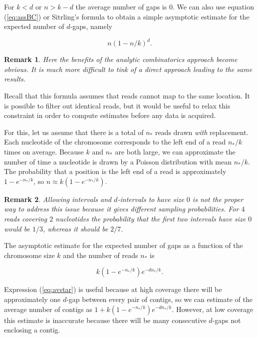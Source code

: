 \documentclass{article}
\newtheorem*{remark}{Remark}
\begin{document}
For $k < d$ or $n > k-d$ the average number of gaps is $0$.  We can also
use equation (\ref{eq:assBC}) or Sitrling's formula to obtain a simple
asymptotic estimate for the expected number of $d$-gaps, namely

\begin{equation*}
n\left(1-n/k\right)^d.
\end{equation*}

\begin{remark}
Here the benefits of the analytic combinatorics approach become obvious.
It is much more difficult to tink of a direct approach leading to the same
results.
\end{remark}

Recall that this formula assumes that reads cannot map to the same
location. It is possible to filter out identical reads, but it would be
useful to relax this constraint in order to compute estimates before any
data is acquired.

For this, let us assume that there is a total of $n_*$ reads drawn
\emph{with} replacement. Each nucleotide of the chromosome corresponds to
the left end of a read $n_*/k$ times on average. Because $k$ and $n_*$ are
both large, we can approximate the number of time a nucleotide is drawn by
a Poisson distribution with mean $n_*/k$. The probability that a position
is the left end of a read is approximately $1-e^{-n_*/k}$, so $n \approx
k(1-e^{-n_*/k})$.

\begin{remark}
Allowing intervals and $d$-intervals to have size $0$ is not the proper
way to address this issue because it gives different sampling
probabilities.  For $4$ reads covering $2$ nucleotides the probability
that the first two intervals have size $0$ would be $1/3$, whereas it
should be $2/7$.
\end{remark}

The asymptotic estimate for the expected number of gaps as a function of
the chromosome size $k$ and the number of reads $n_*$ is

\begin{equation}
\label{eq:avstar}
k(1-e^{-n_*/k})e^{-dn_*/k}.
\end{equation}

Expression (\ref{eq:avstar}) is useful because at high coverage there will
be approximately one $d$-gap between every pair of contigs, so we can
estimate of the average number of contigs as $1 + k(1-e^{-n_*/k})
e^{-dn_*/k}$. However, at low coverage this estimate is inaccurate
because there will be many consecutive $d$-gaps not enclosing a contig.
\end{document}
